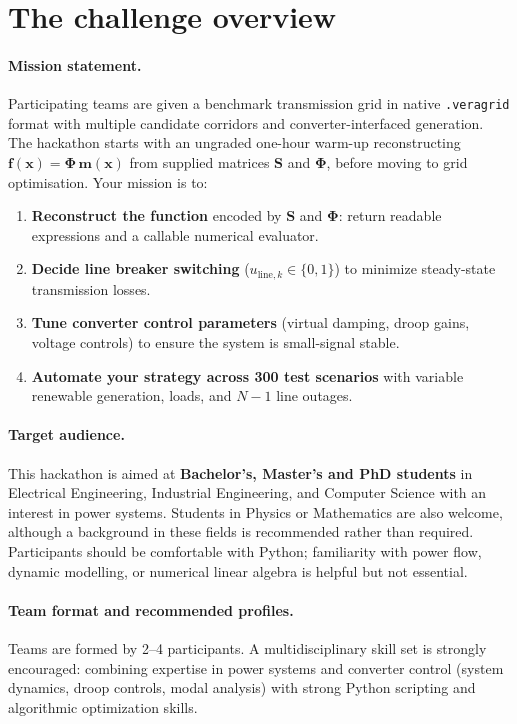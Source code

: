 \documentclass[11pt,a4paper]{article}
\begin{document}
\section{The challenge overview}

\paragraph{Mission statement.}
Participating teams are given a benchmark transmission grid in native \texttt{.veragrid} format with multiple candidate corridors and converter-interfaced generation. The hackathon starts with an ungraded one-hour warm-up reconstructing $\mathbf f(\mathbf x)=\boldsymbol{\Phi}\,\mathbf m(\mathbf x)$ from supplied matrices $\mathbf{S}$ and $\boldsymbol{\Phi}$, before moving to grid optimisation. Your mission is to:
\begin{enumerate}[leftmargin=*, itemsep=2pt]
  \item \textbf{Reconstruct the function} encoded by $\mathbf{S}$ and $\boldsymbol{\Phi}$: return readable expressions and a callable numerical evaluator.
  \item \textbf{Decide line breaker switching} ($u_{\text{line}, k} \in \{0, 1\}$) to minimize steady-state transmission losses.
  \item \textbf{Tune converter control parameters} (virtual damping, droop gains, voltage controls) to ensure the system is small-signal stable.
  \item \textbf{Automate your strategy across 300 test scenarios} with variable renewable generation, loads, and $N-1$ line outages.
\end{enumerate}

\paragraph{Target audience.}
This hackathon is aimed at \textbf{Bachelor's, Master's and PhD students} in Electrical Engineering, Industrial Engineering, and Computer Science with an interest in power systems. Students in Physics or Mathematics are also welcome, although a background in these fields is recommended rather than required. Participants should be comfortable with Python; familiarity with power flow, dynamic modelling, or numerical linear algebra is helpful but not essential.

\paragraph{Team format and recommended profiles.}
Teams are formed by 2--4 participants. A multidisciplinary skill set is strongly encouraged: combining expertise in power systems and converter control (system dynamics, droop controls, modal analysis) with strong Python scripting and algorithmic optimization skills.
\end{document}
